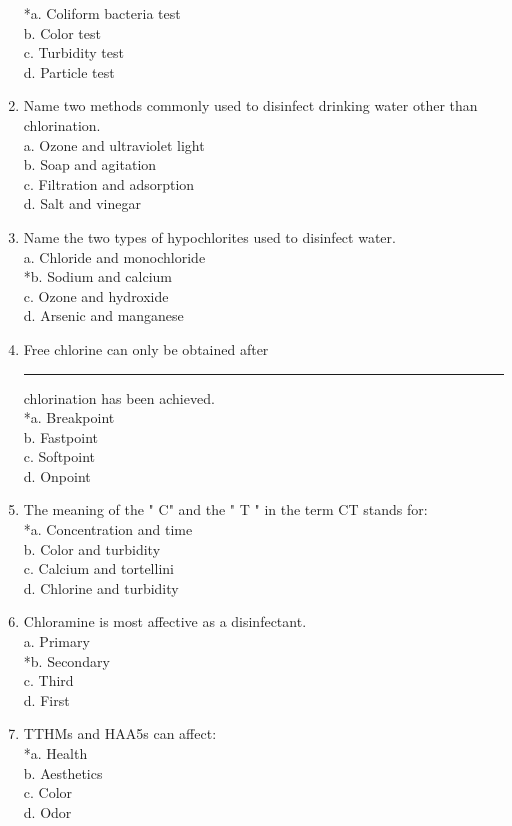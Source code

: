 \begin{enumerate}[1.]
*a. Coliform bacteria test\\
b. Color test\\
c. Turbidity test\\
d. Particle test\\
\item Name two methods commonly used to disinfect drinking water other than chlorination.\\
a. Ozone and ultraviolet light\\
b. Soap and agitation\\
c. Filtration and adsorption\\
d. Salt and vinegar\\
\item Name the two types of hypochlorites used to disinfect water.\\
a. Chloride and monochloride\\
*b. Sodium and calcium\\
c. Ozone and hydroxide\\
d. Arsenic and manganese\\
\item Free chlorine can only be obtained after \rule{1.5cm}{0.5pt} chlorination has been achieved.\\
*a. Breakpoint\\
b. Fastpoint\\
c. Softpoint\\
d. Onpoint\\
\item The meaning of the " C" and the " T " in the term CT stands for:\\
*a. Concentration and time\\
b. Color and turbidity\\
c. Calcium and tortellini\\
d. Chlorine and turbidity\\
\item Chloramine is most affective as a disinfectant.\\
a. Primary\\
*b. Secondary\\
c. Third\\
d. First\\
\item TTHMs and HAA5s can affect:\\
*a. Health\\
b. Aesthetics\\
c. Color\\
d. Odor\\


\end{enumerate}
